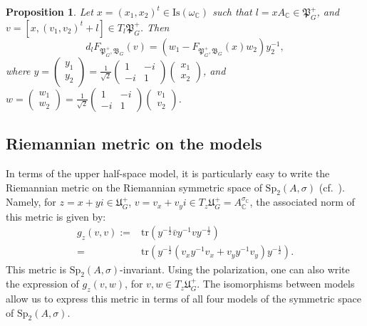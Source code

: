 \documentclass[oneside,11pt]{amsart}
\newtheorem{prop}[thm]{Proposition}
\theoremstyle{definition}
\theoremstyle{remark}
\numberwithin{thm}{section}
\numberwithin{equation}{section}
\begin{document}
\begin{prop}
    Let $x=(x_1,x_2)^t\in\mathrm{Is}(\omega_\mathbb C)$ such that $l=xA_\mathbb C\in\mathfrak{P}_G^+$, and $v=[x,(v_1,v_2)^t+l]\in T_l\mathfrak{P}_G^+$. Then 
    $$d_{l}F_{\mathfrak{P}_G^+,\mathfrak{B}_G}(v)=(w_1-F_{\mathfrak{P}_G^+,\mathfrak{B}_G}(x) w_2)y_2^{-1},$$
    where $y=\begin{pmatrix}y_1 \\y_2\end{pmatrix}=\frac{1}{\sqrt{2}}\begin{pmatrix}
1 & -i \\
-i & 1
\end{pmatrix}\begin{pmatrix}x_1 \\x_2\end{pmatrix}$, and  $w=\begin{pmatrix}w_1 \\w_2\end{pmatrix}=\frac{1}{\sqrt{2}}\begin{pmatrix}
1 & -i \\
-i & 1
\end{pmatrix}\begin{pmatrix}v_1 \\v_2\end{pmatrix}$.
\end{prop}


\subsection{Riemannian metric on the models}

In terms of the upper half-space model, it is particularly easy to write the Riemannian metric on the Riemannian symmetric space of $\mathrm{Sp}_2(A,\sigma)$ (cf.~\cite[Exercise~8, Chapter~XIII]{FK}). Namely, for $z=x+yi\in \mathfrak U^+_G$, $v=v_x+v_yi\in T_z\mathfrak U^+_G=A^{\sigma_\mathbb C}_\mathbb C$,  the associated norm of this metric is given by:
\begin{align*}
    g_z(v,v):=&\mathrm{tr}\left(y^{-\frac{1}{2}}\bar vy^{-1}vy^{-\frac{1}{2}}\right)\\
    =&\mathrm{tr}\left(y^{-\frac{1}{2}}(v_xy^{-1}v_x+v_yy^{-1}v_y)y^{-\frac{1}{2}}\right).    
\end{align*}
This metric is $\mathrm{Sp}_2(A,\sigma)$-invariant. Using the polarization, one can also write the expression of $g_z(v,w)$, for $v,w\in T_z\mathfrak U^+_G$. The isomorphisms between models allow us to express this metric in terms of all four models of the symmetric space of $\mathrm{Sp}_2(A,\sigma)$.
\end{document}
